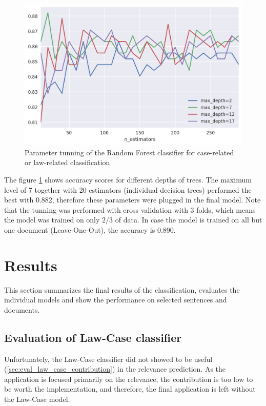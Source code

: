 \documentclass[
  digital, %
  notable,   %
  nolof,     %
  nolot,     %
]{fithesis3}
\begin{document}
\begin{figure}[h]
\caption{Parameter tunning of the Random Forest classifier for case-related or law-related classification}
\label{fig:eval_law-case-model-tunning}
\includegraphics[width=\textwidth]{img/eval_law-case-model-tunning}
\end{figure}

The figure \ref{fig:eval_law-case-model-tunning} shows accuracy scores for different depths of trees.
The maximum level of 7 together with 20 estimators (individual decision trees) performed the best with 0.882, therefore these parameters were plugged in the final model.
Note that the tunning was performed with cross validation with 3 folds, which means the model was trained on only $2/3$ of data.
In case the model is trained on all but one document (Leave-One-Out), the accuracy is 0.890.

\section{Results}
This section summarizes the final results of the classification, evaluates the individual models and show the performance on selected sentences and documents.

\subsection{Evaluation of Law-Case classifier}
Unfortunately, the Law-Case classifier did not showed to be useful (\ref{sec:eval_law_case_contribution}) in the relevance prediction.
As the application is focused primarily on the relevance, the contribution is too low to be worth the implementation, and therefore, the final application is left without the Law-Case model. 
\end{document}
